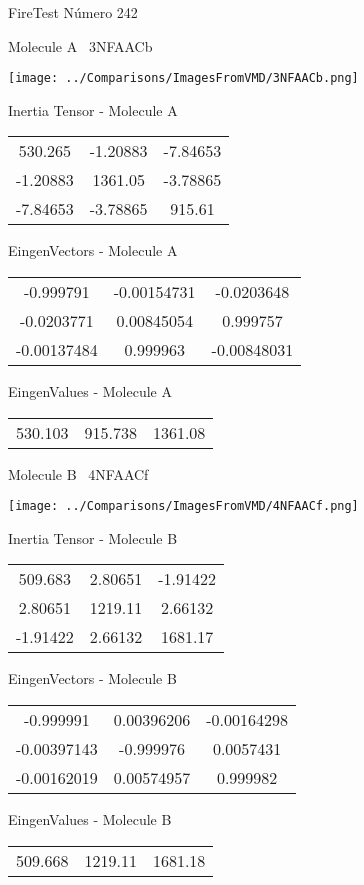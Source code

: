 \vtab[-3cm]
\begin{center}
{\large FireTest \tab Número 242}
\end{center}
\begin{multicols}{2}
\begin{center}

Molecule A \
3NFAACb

\texttt{[image: ../Comparisons/ImagesFromVMD/3NFAACb.png]}

Inertia Tensor - Molecule A \\
\begin{tabular}{|c c c|}
530.265	 & 	-1.20883	 & 	-7.84653	 \\
-1.20883	 & 	1361.05	 & 	-3.78865	 \\
-7.84653	 & 	-3.78865	 & 	915.61
\end{tabular}

\vtab
 EingenVectors - Molecule A     \\
\begin{tabular}{|c c c|}
-0.999791	 & 	-0.00154731	 & 	-0.0203648	 \\
-0.0203771	 & 	0.00845054	 & 	0.999757	 \\
-0.00137484	 & 	0.999963	 & 	-0.00848031
\end{tabular}

\vtab
 EingenValues - Molecule A     \\
\begin{tabular}{|c c c|}
530.103	 & 	915.738	 & 	1361.08	 \\
\end{tabular}
\columnbreak

Molecule B \
4NFAACf

\texttt{[image: ../Comparisons/ImagesFromVMD/4NFAACf.png]}

Inertia Tensor - Molecule B \\
\begin{tabular}{|c c c|}
509.683	 & 	2.80651	 & 	-1.91422	 \\
2.80651	 & 	1219.11	 & 	2.66132	 \\
-1.91422	 & 	2.66132	 & 	1681.17
\end{tabular}

\vtab
 EingenVectors - Molecule B     \\
\begin{tabular}{|c c c|}
-0.999991	 & 	0.00396206	 & 	-0.00164298	 \\
-0.00397143	 & 	-0.999976	 & 	0.0057431	 \\
-0.00162019	 & 	0.00574957	 & 	0.999982
\end{tabular}

\vtab
 EingenValues - Molecule B     \\
\begin{tabular}{|c c c|}
509.668	 & 	1219.11	 & 	1681.18	 \\
\end{tabular}

\end{center}
\end{multicols}

